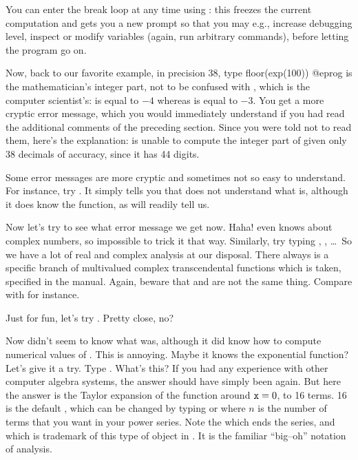  You can enter the break loop at any time using
: this freezes the current computation and gets you a new
prompt so that you may e.g., increase debugging level, inspect or modify
variables (again, run arbitrary commands), before letting the program go
on.
\medskip

Now, back to our favorite example, in precision 38, type
\bprog
  floor(exp(100))
@eprog\noindent
{} is the mathematician's integer part, not to be confused with
, which is the computer scientist's:  is equal
to $-4$ whereas  is equal to $-3$.  You get a more
cryptic error message, which you would immediately understand if you had read
the additional comments of the preceding section. Since you were told not to
read them, here's the explanation:  is unable to compute the
integer part of  given only 38 decimals of accuracy, since
it has 44 digits.

Some error messages are more cryptic and sometimes not so easy to understand.
For instance, try . It simply tells you that  does not
understand what  is, although it does know the 
function, as  will readily tell us.

Now let's try  to see what error message we get now. Haha!
 even knows about complex numbers, so impossible to trick it that
way. Similarly, try typing , , \dots\ So we have a lot of real and complex analysis at our disposal.
There always is a specific branch of multivalued complex transcendental
functions which is taken, specified in the manual. Again, beware that
 and  are not the same thing. Compare  with
 for instance.

Just for fun, let's try . Pretty close, no?

\medskip
Now  didn't seem to know what  was, although it did know
how to compute numerical values of . This is annoying. Maybe it
knows the exponential function? Let's give it a try. Type .
What's this? If you had any experience with other computer algebra systems,
the answer should have simply been  again. But here the answer is
the Taylor expansion of the function around ${\tt x}=0$, to 16 terms. 16 is
the default , which can be changed by typing  or  where $n$ is the number of terms
that you want in your power series. Note the  which ends the
series, and which is trademark of this type of object in . It is the
familiar ``big--oh'' notation of analysis.

